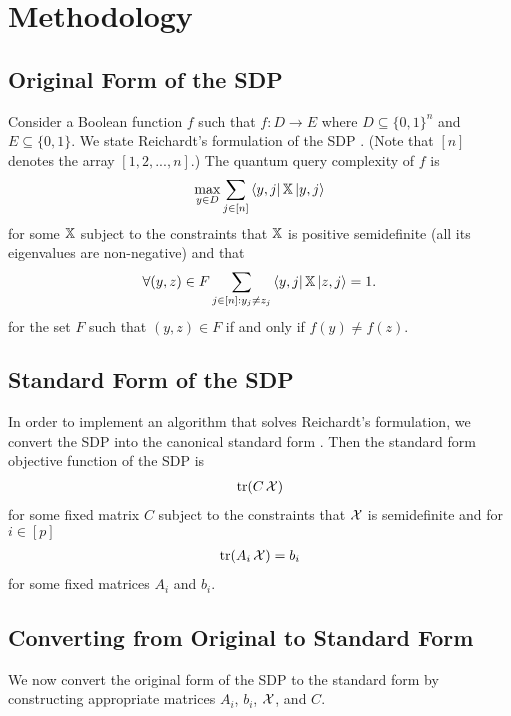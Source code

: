 \section{Methodology}\label{sec:method}

\subsection{Original Form of the SDP}
Consider a Boolean function $f$ such that
$f: D \rightarrow E$ where 
$D \subseteq {\{0,1\}}^n$ and $E \subseteq {\{0,1\}}$.
We state Reichardt's formulation of the SDP \cite{reichardt2009span}.
(Note that $[n]$ denotes the array
$[1,2,...,n]$.)
The quantum query complexity of $f$ is
\begin{align} \label{Eq:reichardt_obj} 
    \max_{y \in D} \sum_{j \in [n]} \bra{y,j}\operatorname{\mathbb{X}}\ket{y,j} 
\end{align}
for some $\operatorname{\mathbb{X}}$ subject to the constraints that $\operatorname{\mathbb{X}}$ is positive semidefinite
(all its eigenvalues are non-negative)
and that
\begin{align}\label{Eq:reichardt_F0}
    \forall (y,z) \in F \sum_{j \in [n]: y_j \ne z_j} 
    \bra{y,j} \operatorname{\mathbb{X}} \ket{z, j} = 1.
\end{align}
for the set $F$ such that $(y,z) \in F$ if and only if
$f(y) \neq f(z)$.

\subsection{Standard Form of the SDP}
In order to implement an algorithm that solves 
Reichardt's formulation, we convert the SDP
into the canonical standard form
\cite{boyd2004convex}.
Then the standard form objective function of the SDP is
\begin{align}\label{Eq:boyd_obj}
    \operatorname{\text{tr}}(C\operatorname{\mathcal{X}})
\end{align}
for some fixed matrix $C$ subject to the constraints
that $\operatorname{\mathcal{X}}$ is semidefinite and for $i \in [p]$
\begin{align} \label{Eq:boyd_trace}
    \operatorname{\text{tr}}(A_i \operatorname{\mathcal{X}}) = b_i
\end{align}
for some fixed matrices $A_i$ and $b_i$.

\subsection{Converting from Original to Standard Form}
We now convert the original form of the SDP to
the standard form by constructing appropriate matrices $A_i$, $b_i$, $\operatorname{\mathcal{X}}$, and $C$.

